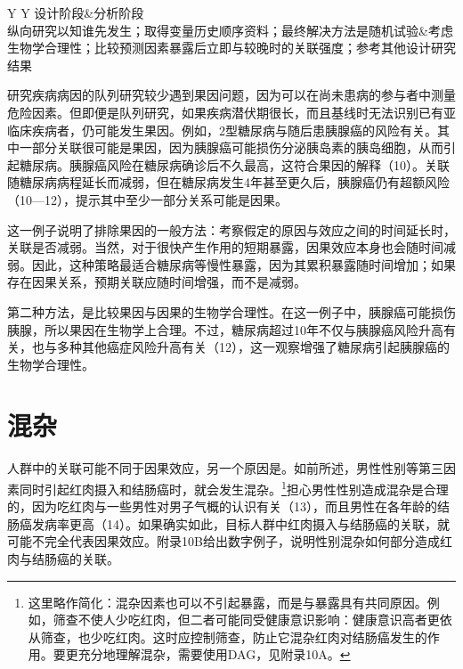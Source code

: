 \begin{table}[htbp]\centering\small
\caption*{\textbf{表10.3\quad 观察性研究中辨清因果方向的策略}}
\begin{tabularx}{\textwidth}{Y Y}\toprule
设计阶段&分析阶段\\\midrule
纵向研究以知谁先发生；取得变量历史顺序资料；最终解决方法是随机试验&考虑生物学合理性；比较预测因素暴露后立即与较晚时的关联强度；参考其他设计研究结果\\\bottomrule
\end{tabularx}
\end{table}

研究疾病病因的队列研究较少遇到果因问题，因为可以在尚未患病的参与者中测量危险因素。但即便是队列研究，如果疾病潜伏期很长，而且基线时无法识别已有亚临床疾病者，仍可能发生果因。例如，2型糖尿病与随后患胰腺癌的风险有关。其中一部分关联很可能是果因，因为胰腺癌可能损伤分泌胰岛素的胰岛细胞，从而引起糖尿病。胰腺癌风险在糖尿病确诊后不久最高，这符合果因的解释（10）。关联随糖尿病病程延长而减弱，但在糖尿病发生4年甚至更久后，胰腺癌仍有超额风险（10—12），提示其中至少一部分关系可能是因果。

这一例子说明了排除果因的一般方法：考察假定的原因与效应之间的时间延长时，关联是否减弱。当然，对于很快产生作用的短期暴露，因果效应本身也会随时间减弱。因此，这种策略最适合糖尿病等慢性暴露，因为其累积暴露随时间增加；如果存在因果关系，预期关联应随时间增强，而不是减弱。

第二种方法，是比较果因与因果的生物学合理性。在这一例子中，胰腺癌可能损伤胰腺，所以果因在生物学上合理。不过，糖尿病超过10年不仅与胰腺癌风险升高有关，也与多种其他癌症风险升高有关（12），这一观察增强了糖尿病引起胰腺癌的生物学合理性。

\section{混杂}
人群中的关联可能不同于因果效应，另一个原因是。如前所述，男性性别等第三因素同时引起红肉摄入和结肠癌时，就会发生混杂。\footnote{这里略作简化：混杂因素也可以不引起暴露，而是与暴露具有共同原因。例如，筛查不使人少吃红肉，但二者可能同受健康意识影响：健康意识高者更依从筛查，也少吃红肉。这时应控制筛查，防止它混杂红肉对结肠癌发生的作用。要更充分地理解混杂，需要使用DAG，见附录10A。}担心男性性别造成混杂是合理的，因为吃红肉与一些男性对男子气概的认识有关（13），而且男性在各年龄的结肠癌发病率更高（14）。如果确实如此，目标人群中红肉摄入与结肠癌的关联，就可能不完全代表因果效应。附录10B给出数字例子，说明性别混杂如何部分造成红肉与结肠癌的关联。

